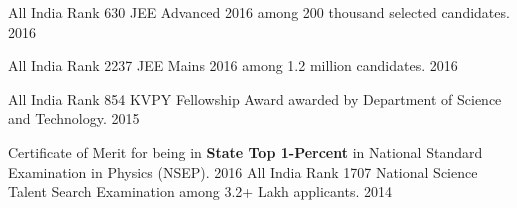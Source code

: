 \begin{cvhonors}
	\cvhonor
		{All India Rank 630}
		{JEE Advanced 2016 among 200 thousand selected candidates.}
		{}
		{2016}

	\cvhonor
		{All India Rank 2237}
		{JEE Mains 2016 among 1.2 million candidates.}
		{}
		{2016}

	\cvhonor
		{All India Rank 854}
		{KVPY Fellowship Award awarded by Department of Science and Technology.}
		{}
		{2015}

	\cvhonor
		{Certificate of Merit}{
			for being in \textbf{State Top 1-Percent} in National Standard Examination in Physics (NSEP).
		}
		{}
		{2016}
	\cvhonor
		{All India Rank 1707}
		{National Science Talent Search Examination among 3.2+ Lakh applicants.}
		{}
		{2014}

\end{cvhonors}

